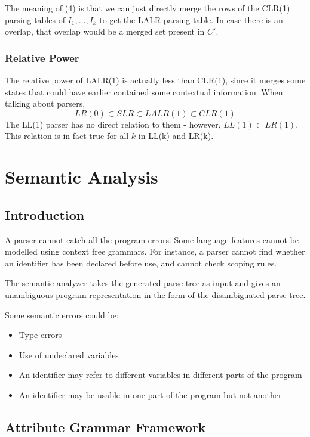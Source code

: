 \documentclass[12pt,letterpaper]{amsbook}
\theoremstyle{definition}
\begin{document}
The meaning of (4) is that we can just directly merge the rows of the CLR(1) parsing tables of $I_1,...,I_k$ to get the LALR parsing table. In case there is an overlap, that overlap would be a merged set present in $C'$.

\subsection{Relative Power}

The relative power of LALR(1) is actually less than CLR(1), since it merges some states that could have earlier contained some contextual information. When talking about parsers,
\[LR(0) \subset SLR \subset LALR(1) \subset CLR(1)\]
The LL(1) parser has no direct relation to them - however, $LL(1) \subset LR(1)$. This relation is in fact true for all $k$ in LL(k) and LR(k).

\chapter{Semantic Analysis}

\section{Introduction}

A parser cannot catch all the program errors. Some language features cannot be modelled using context free grammars. For instance, a parser cannot find whether an identifier has been declared before use, and cannot check scoping rules.

The semantic analyzer takes the generated parse tree as input and gives an unambiguous program representation in the form of the disambiguated parse tree.

Some semantic errors could be:

\begin{itemize}
  \item Type errors
  \item Use of undeclared variables
  \item An identifier may refer to different variables in different parts of the program
  \item An identifier may be usable in one part of the program but not another.
\end{itemize}

\section{Attribute Grammar Framework}
\end{document}
